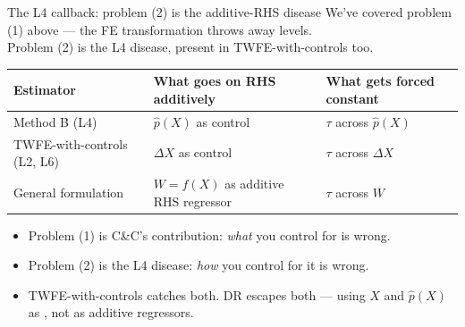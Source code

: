\documentclass[aspectratio=169,11pt]{beamer}
\begin{document}
\begin{frame}{The L4 callback: problem (2) is the additive-RHS disease}
\vspace{0.3em}
We've covered problem (1) above --- the FE transformation throws away levels. \\
Problem (2) is the L4 disease, present in TWFE-with-controls too.
\vspace{0.4em}
\begin{center}
\renewcommand{\arraystretch}{1.4}
\footnotesize
\begin{tabular}{@{}lll@{}}
\toprule
\textbf{Estimator} & \textbf{What goes on RHS additively} & \textbf{What gets forced constant} \\
\midrule
\rowcolor{remixgreenlight}
Method B (L4)             & $\widehat{p}(X)$ as control          & $\tau$ across $\widehat{p}(X)$ \\
\rowcolor{remixgreenlight}
TWFE-with-controls (L2, L6) & $\Delta X$ as control              & $\tau$ across $\Delta X$       \\
\rowcolor{remixgreenlight}
General formulation       & $W = f(X)$ as additive RHS regressor & $\tau$ across $W$              \\
\bottomrule
\end{tabular}
\end{center}
\vspace{0.3em}
\begin{itemize}\small
  \item Problem (1) is C\&C's contribution: \textit{what} you control for is wrong.
  \item Problem (2) is the L4 disease: \textit{how} you control for it is wrong.
  \item TWFE-with-controls catches both. DR escapes both --- using $X$ and $\widehat{p}(X)$ as , not as additive regressors.
\end{itemize}
\end{frame}
\end{document}

